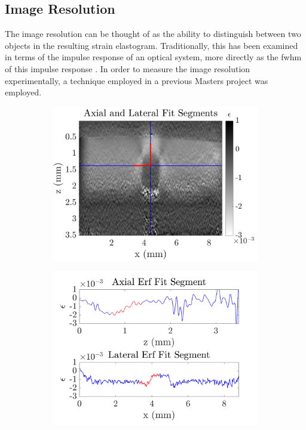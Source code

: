\subsection{Image Resolution}
The image resolution can be thought of as the ability to distinguish between two objects in the resulting strain elastogram. Traditionally, this has been examined in terms of the impulse response of an optical system, more directly as the \ac{fwhm} of this impulse response \cite{reynolds_resolution_1989}. In order to measure the image resolution experimentally, a technique employed in a previous Masters project \cite{hepburn_improving_2017} was employed.

\begin{figure}[t]
	\centering
	\begin{subfigure}{0.49\textwidth}
		\centering
		\includegraphics[width=\textwidth]{strainreview_figs/imageres_regions.png}
	\end{subfigure}
	\begin{subfigure}{0.49\textwidth}
		\centering
		\includegraphics[width=\textwidth]{strainreview_figs/lateral_axial_segments.png}

\end{subfigure}
\end{figure}
